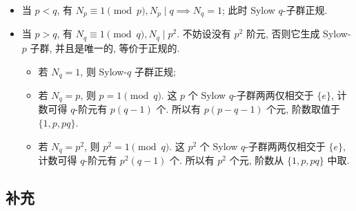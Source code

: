 \begin{vain}
    \begin{itemize}
        \item 当 $p<q$, 有 $N_{p}\equiv1\pmod{p}, N_{p}\mid q\implies N_{q}=1$; 此时 Sylow $q$-子群正规.
        \item 当 $p>q$, 有 $N_{q}\equiv1\pmod{q}, N_{q}\mid p^{2}$. 不妨设没有 $p^{2}$ 阶元, 否则它生成 Sylow-$p$ 子群,  
        并且是唯一的, 等价于正规的.
        \begin{itemize}
            \item 若 $N_{q}=1$, 则 Sylow-$q$ 子群正规; 
            \item 若 $N_{q}=p$, 则 $p=1\pmod{q}$. 这 $p$ 个 Sylow $q$-子群两两仅相交于 $\{e\}$, 计数可得 $q$-阶元有 $p(q-1)$ 个. 
            所以有 $p(p-q-1)$ 个元, 阶数取值于 $\{1,p,pq\}$. 
            \item 若 $N_{q}=p^{2}$, 则 $p^{2}=1\pmod{q}$. 这 $p^{2}$ 个 Sylow $q$-子群两两仅相交于 $\{e\}$, 计数可得 $q$-阶元有 $p^{2}(q-1)$ 个. 
            所以有 $p^{2}$ 个元, 阶数从 $\{1,p, p q\}$ 中取. 
        \end{itemize}
        
    \end{itemize}
\end{vain}




\subsection{补充}

